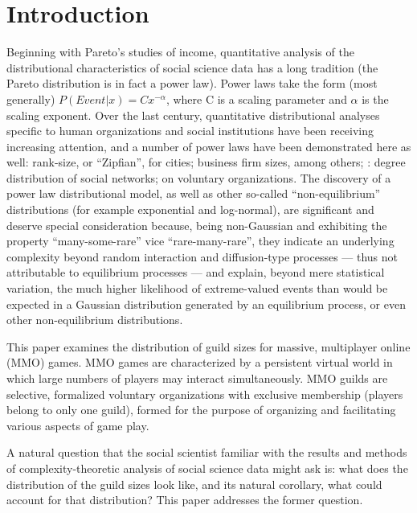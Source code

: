 \documentclass[pdftex,12pt]{llncs}
\begin{document}
\section{Introduction}
Beginning with Pareto’s  studies of income, quantitative analysis of the distributional characteristics of social science data has a long tradition (the Pareto distribution is in fact a power law).
Power laws take the form (most generally) $P(Event | x) = Cx^{-\alpha}$, where C is a scaling parameter and $\alpha$ is the scaling exponent.
Over the last century, quantitative distributional analyses specific to human organizations and social institutions have been receiving increasing attention, and a number of power laws have been demonstrated here as well: rank-size, or “Zipfian”, for cities;  business firm sizes, \parencite{axtell2001} among others; \parencite{BA1999}: degree distribution of social networks; \parencite{LAS2003} on voluntary organizations.
The discovery of a power law distributional model, as well as other so-called “non-equilibrium” distributions (for example exponential and log-normal), are significant and deserve special consideration because, being non-Gaussian and exhibiting the property “many-some-rare” vice “rare-many-rare”, they indicate an underlying complexity beyond random interaction and diffusion-type processes --- thus not attributable to equilibrium processes --- and explain, beyond mere statistical variation, the much higher likelihood of extreme-valued events than would be expected in a Gaussian distribution generated by an equilibrium process, or even other non-equilibrium distributions.

This paper examines the distribution of guild sizes for massive, multiplayer online (MMO) games.
MMO games are characterized by a persistent virtual world in which large numbers of players may interact simultaneously.
MMO guilds are selective, formalized voluntary organizations with exclusive membership (players belong to only one guild), formed for the purpose of organizing and facilitating various aspects of game play.

A natural question that the social scientist familiar with the results and methods of complexity-theoretic analysis of social science data might ask is: what does the distribution of the guild sizes look like, and its natural corollary, what could account for that distribution?
This paper addresses the former question.
\end{document}
